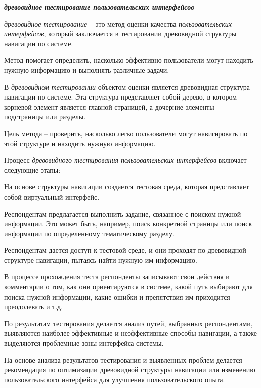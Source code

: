 {\textbf{\textit{древовидное тестирование пользовательских интерфейсов}}

\textit{древовидное тестирование} -- это метод оценки качества \textit{пользовательских интерфейсов}, который заключается в тестировании древовидной структуры навигации по системе.

Метод помогает определить, насколько эффективно пользователи могут находить нужную информацию и выполнять различные задачи.

В \textit{древовидном тестировании} объектом оценки является древовидная структура навигации по системе. Эта структура представляет собой дерево, в котором корневой элемент является главной страницей, а дочерние элементы -- подстраницы или разделы. 

Цель метода -- проверить, насколько легко пользователи могут навигировать по этой структуре и находить нужную информацию.

Процесс \textit{древовидного тестирования пользовательских интерфейсов} включает следующие этапы:
\begin{textitemize}
	\item На основе структуры навигации создается тестовая среда, которая представляет собой виртуальный интерфейс.
	
	\item Респондентам предлагается выполнить задание, связанное с поиском нужной информации. Это может быть, например, поиск конкретной страницы или поиск информации по определенному тематическому разделу.
	
	\item Респондентам дается доступ к тестовой среде, и они проходят по древовидной структуре навигации, пытаясь найти нужную им информацию.
	
	\item В процессе прохождения теста респонденты записывают свои действия и комментарии о том, как они ориентируются в системе, какой путь выбирают для поиска нужной информации, какие ошибки и препятствия им приходится преодолевать и т.д.
	
	\item По результатам тестирования делается анализ путей, выбранных респондентами, выявляются наиболее эффективные и неэффективные способы навигации, а также выделяются проблемные зоны интерфейса системы.
	
	\item На основе анализа результатов тестирования и выявленных проблем делается рекомендация по оптимизации древовидной структуры навигации или изменению пользовательского интерфейса для улучшения пользовательского опыта.
\end{textitemize}

}
